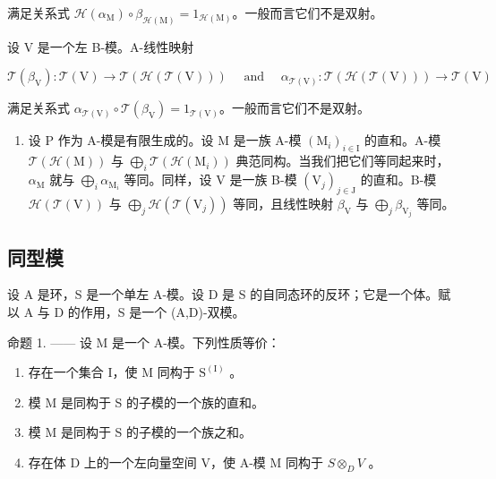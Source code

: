 满足关系式 \(\mathcal{H}(\alpha_{\mathrm{M}})\circ\beta_{\mathcal{H}(\mathrm{M})}=1_{\mathcal{H}(\mathrm{M})}\)。一般而言它们不是双射。

设 V 是一个左 B-模。A-线性映射

\[
\mathcal {T} (\beta_ {\mathrm{V}}): \mathcal {T} (\mathrm{V}) \to \mathcal {T} (\mathcal {H} (\mathcal {T} (\mathrm{V}))) \quad \text { and } \quad \alpha_ {\mathcal {T} (\mathrm{V})}: \mathcal {T} (\mathcal {H} (\mathcal {T} (\mathrm{V}))) \to \mathcal {T} (\mathrm{V})
\]

满足关系式 \(\alpha_{\mathcal{T}(\mathrm{V})}\circ \mathcal{T}(\beta_{\mathrm{V}}) = 1_{\mathcal{T}(\mathrm{V})}\)。一般而言它们不是双射。

\begin{enumerate}
\def\labelenumi{\arabic{enumi})}
\setcounter{enumi}{2}
\tightlist
\item
  设 P 作为 A-模是有限生成的。设 M 是一族 A-模 \((\mathrm{M}_{i})_{i\in\mathrm{I}}\) 的直和。A-模 \(\mathcal{T}(\mathcal{H}(\mathrm{M}))\) 与 \(\bigoplus_{i}\mathcal{T}(\mathcal{H}(\mathrm{M}_{i}))\) 典范同构。当我们把它们等同起来时，\(\alpha_{\mathrm{M}}\) 就与 \(\bigoplus_{i}\alpha_{\mathrm{M}_{i}}\) 等同。同样，设 V 是一族 B-模 \((\mathrm{V}_j)_{j\in \mathrm{J}}\) 的直和。B-模 \(\mathcal{H}(\mathcal{T}(\mathrm{V}))\) 与 \(\bigoplus_{j}\mathcal{H}(\mathcal{T}(\mathrm{V}_{j}))\) 等同，且线性映射 \(\beta_{\mathrm{V}}\) 与 \(\bigoplus_{j}\beta_{\mathrm{V}_{j}}\) 等同。
\end{enumerate}

\subsection{同型模}

设 A 是环，S 是一个单左 A-模。设 D 是 S 的自同态环的反环；它是一个体。赋以 A 与 D 的作用，S 是一个 (A,D)-双模。

命题 1. —— 设 M 是一个 A-模。下列性质等价：

\begin{enumerate}
\def\labelenumi{(\roman{enumi})}
\item
  存在一个集合 I，使 M 同构于 \(\mathrm{S}^{(\mathrm{I})}\) 。
\item
  模 M 是同构于 S 的子模的一个族的直和。
\item
  模 M 是同构于 S 的子模的一个族之和。
\item
  存在体 D 上的一个左向量空间 V，使 A-模 M 同构于 \(S \otimes_{D} V\) 。
\end{enumerate}

